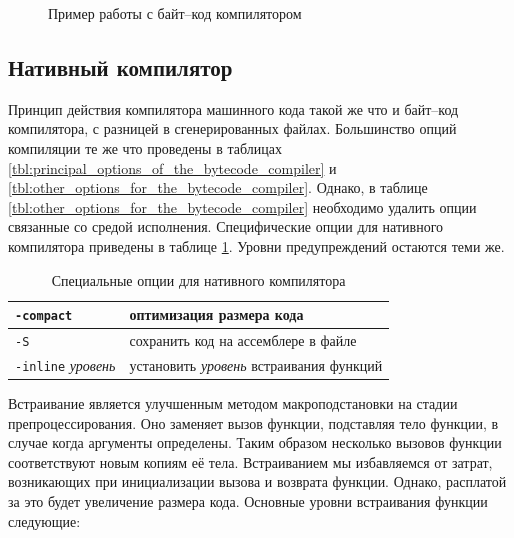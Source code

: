 \begin{figure}[hc]
	\caption{\label{fig:session_with_bytecode_compiler}Пример работы с байт--код
компилятором}
\end{figure}

\subsection{Нативный компилятор}

Принцип действия компилятора машинного кода такой же что и байт--код
компилятора, с разницей в сгенерированных файлах. Большинство опций компиляции
те же что проведены в таблицах
\ref{tbl:principal_options_of_the_bytecode_compiler} и
\ref{tbl:other_options_for_the_bytecode_compiler}. Однако, в таблице
\ref{tbl:other_options_for_the_bytecode_compiler} необходимо удалить опции
связанные со средой исполнения. Специфические опции для нативного компилятора
приведены в таблице \ref{tbl:options_specific_to_the_native_compiler}. Уровни
предупреждений остаются теми же.

\begin{table}[hc]
	\centering
	\caption{\label{tbl:options_specific_to_the_native_compiler}Специальные
опции для нативного компилятора}
	\begin{tabular}{|l|l|}
	\hline
	\texttt{-compact} & оптимизация размера кода \\
	\hline
	\texttt{-S} & сохранить код на ассемблере в файле \\
	\hline
	\texttt{-inline} \it{уровень} & установить {\it уровень} \enq{агрессивности}
встраивания функций \\
	\hline
	\end{tabular}
\end{table}

Встраивание является улучшенным методом макроподстановки на стадии
препроцессирования. Оно заменяет вызов функции, подставляя тело функции, в
случае когда аргументы определены. Таким образом несколько вызовов функции
соответствуют новым копиям её тела. Встраиванием мы избавляемся от затрат,
возникающих при инициализации вызова и возврата функции. Однако, расплатой за
это будет увеличение размера кода. Основные уровни встраивания функции
следующие:

